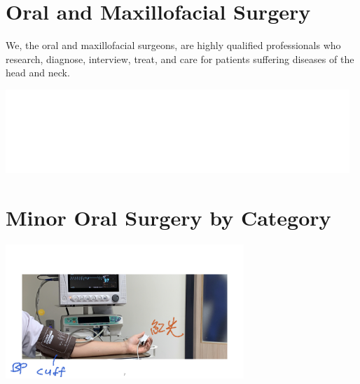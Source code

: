 \documentclass[
paper=landscape,
paper=160mm:90mm, %
fontsize=11pt, %
pagesize, %
parskip=half-, %
]{scrartcl} %
\theoremstyle{mythmstyle} %
\begin{document}
\section{Oral and Maxillofacial Surgery}

We, the oral and maxillofacial surgeons, are highly qualified professionals who research, diagnose, interview, treat, and care for patients suffering diseases of the head and neck.


\includegraphics[width=13cm]{TAOMS_LOGO.png}

\clearpage
\section{Minor Oral Surgery by Category} %

\begin{center} %
    \centering
    \captionsetup{labelformat=empty}
    \includegraphics[width=9cm]{ContemporaryOMS_vitals.jpeg.001.jpeg}
\end{center}


\end{document}
